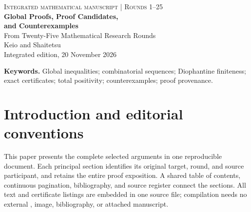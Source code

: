 \documentclass[11pt,a4paper]{article}
\begin{document}
\thispagestyle{empty}
\begin{center}
{\small\textsc{Integrated mathematical manuscript \quad | \quad Rounds 1--25}}\\[14pt]
{\LARGE\bfseries Global Proofs, Proof Candidates,\\[4pt]
and Counterexamples}\\[10pt]
{\large From Twenty-Five Mathematical Research Rounds}\\[18pt]
{\large Keio and Shaitetsu}\\[5pt]
{\small Integrated edition, 20 November 2026}
\end{center}
\vspace{9pt}
\begin{abstract}
This paper places the complete mathematical arguments from a selected
twenty-five-round research archive into one continuous manuscript.
It incorporates forty-one original \LaTeX{} manuscripts and one
reconstructed proof checkpoint, grouped into forty-one principal
sections. The subjects include exact graph colorings, prime-power
Diophantine equations, binomial transforms and divisibility, numerical
semigroups, special-function inequalities, total positivity,
set-partition sequences, real-rootedness, modular congruences, and
spectral counterexamples.

Twelve topics have explicit archived internal proof-review records.
Twenty-four additional original manuscripts contain complete-range
arguments or proof candidates, and a code-only checkpoint is reconstructed
with its complete exact certificate. Four further manuscripts supply
negative resolutions of five named assertions. These counts use different
units where stated: the two independently obtained Eulerian-maxima
proofs form one topic, while one Stern-polynomial manuscript and one
gap-semigroup manuscript each address two numbered conjectures.

All theorem statements, proof arguments, substantive auxiliary results,
and source-specific limitations from the selected manuscripts are
retained. Review status is recorded separately from the mathematical
assertions. The integrated edition does not assert external peer review,
formal proof-assistant certification, or universal publication priority.
\end{abstract}
\noindent\textbf{Keywords.} Global inequalities; combinatorial sequences;
Diophantine finiteness; exact certificates; total positivity;
counterexamples; proof provenance.
\clearpage
\tableofcontents
\clearpage
\section*{Introduction and editorial conventions}
This paper presents the complete selected arguments in one reproducible
document. Each principal section identifies its original target, round,
and source participant, and retains the entire proof exposition. A shared
table of contents, continuous pagination, bibliography, and source
register connect the sections. All text and certificate listings are
embedded in one source file; compilation needs no external
\texttt{\string}, image, bibliography, or attached manuscript.
\end{document}
